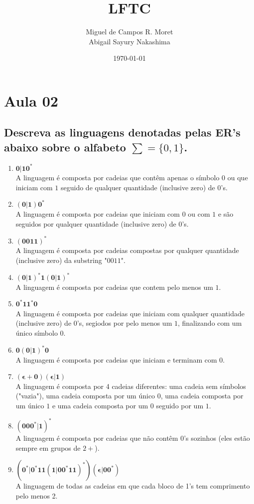 \documentclass[a4paper,12pt]{article}
\title{LFTC}
\author{Miguel de Campos R. Moret \\ Abigail Sayury Nakashima}
\date{\today}
\begin{document}
\maketitle
\newpage

\tableofcontents
\newpage

\section{Aula 02 }
    \subsection{Descreva as linguagens denotadas pelas ER’s abaixo sobre o alfabeto $\sum = \{0,1\}$.}
    \begin{enumerate}[label=\textbf{\alph* -}]
        \item $\mathbf{0|10^*}$
            \\ A linguagem é composta por cadeias que contêm apenas o símbolo $0$ ou que iniciam com $1$ seguido de qualquer quantidade (inclusive zero) de $0$'s.
        \item $\mathbf{(0|1)0^*}$
            \\ A linguagem é composta por cadeias que iniciam com $0$ ou com $1$ e são seguidos por qualquer quantidade (inclusive zero) de $0$'s.
        \item $\mathbf{(0011)^*}$
            \\ A linguagem é composta por cadeias compostas por qualquer quan\-tidade (inclusive zero) da substring "$0011$".
        \item $\mathbf{(0|1)^*1(0|1)^*}$
            \\ A linguagem é composta por cadeias que contem pelo menos um $1$.
        \item $\mathbf{0^*11^*0}$
            \\ A linguagem é composta por cadeias que iniciam com qualquer quan\-tidade (inclusive zero) de $0$'s, segiodos por pelo menos um $1$, finalizando com um único símbolo $0$.
        \item $\mathbf{0(0|1)^*0}$
            \\ A linguagem é composta por cadeias que iniciam e  terminam com $0$.
        \item $\mathbf{(\epsilon+0)(\epsilon|1)}$
            \\ A linguagem é composta por 4 cadeias diferentes: uma cadeia sem símbolos ("vazia"), uma cadeia composta por um único $0$, uma cadeia composta por um único $1$ e uma cadeia composta por um $0$ seguido por um $1$.
        \item $\mathbf{(000^*|1)^*}$
            \\ A linguagem é composta por cadeias que não contêm $0$'s sozinhos (eles estão sempre em grupos de $2+$).
        \item $\mathbf{(0^*|0^*11(1|00^*11)^*)(\epsilon|00^*)}$
            \\ A linguagem de todas as cadeias em que cada bloco de 1’s tem comprimento pelo menos 2.
    \end{enumerate}
\end{document}
